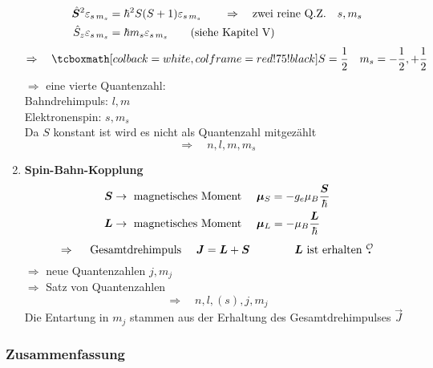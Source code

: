 \begin{enumerate}[1)]
\begin{align*}
	\hat{\bm{S}}^2 \varepsilon_{s \, m_s} &= \hbar^2 S (S + 1) \varepsilon_{s \, m_s} \qquad \Rightarrow \quad \textrm{zwei reine Q.Z.} \quad s, m_s\\
	\hat{S}_z \varepsilon_{s \, m_s} &= \hbar m_s \varepsilon_{s \, m_s} \qquad (\textrm{siehe Kapitel V})
	\end{align*}
	\begin{equation*}
	\Rightarrow \quad \rmbox{ S = \frac{1}{2} \quad m_s = - \frac{1}{2}, + \frac{1}{2} }
	\end{equation*}
	\noindent
	$ \Rightarrow $ eine vierte Quantenzahl:\\[5pt]
	Bahndrehimpuls: $ l, m $\\
	Elektronenspin: $ s, m_s $\\
	Da $ S $ konstant ist wird es nicht als Quantenzahl mitgezählt
	\begin{equation*}
	\Rightarrow \quad n, l, m, m_s
	\end{equation*}
	\item \textbf{Spin-Bahn-Kopplung}
	\begin{align*}
	\bm{S} &\to \textrm{ magnetisches Moment } \quad \bm{\mu}_{S} = - g_e \mu_{B} \frac{\bm{S}}{\hbar}\\
	\bm{L} &\to \textrm{ magnetisches Moment } \quad \bm{\mu}_{L} = - \mu_{B} \frac{\bm{L}}{\hbar}
	\end{align*}
	\begin{equation*}
	\Rightarrow \quad \tx{ Gesamtdrehimpuls } \quad \vec{J} = \vec{L} + \vec{S} \qquad \qquad \vec{L} \tx{ ist erhalten \mau}
	\end{equation*}
	$ \Rightarrow $ neue Quantenzahlen $ j, m_j $\\
	$ \Rightarrow $ Satz von Quantenzahlen
	\begin{equation*}
	\Rightarrow \quad n, l, (s), j, m_j
	\end{equation*}
	Die Entartung in $ m_j $ stammen aus der Erhaltung des Gesamtdrehimpulses $ \vec{J} $ \mau
\end{enumerate}

\subsubsection{Zusammenfassung}

